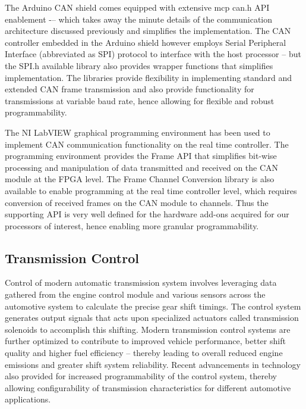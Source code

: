 \documentclass{article}
\begin{document}
\begin{flushleft}
The Arduino CAN shield comes equipped with extensive mcp can.h API enablement -– which takes away the minute details of the communication architecture discussed previously and simplifies the implementation. The CAN controller embedded in the Arduino shield however employs Serial Peripheral Interface (abbreviated as SPI) protocol to interface with the host processor – but the SPI.h available library also provides wrapper functions that simplifies implementation. The libraries provide flexibility in implementing standard and extended CAN frame transmission and also provide functionality for transmissions at variable baud rate, hence allowing for flexible and robust programmability. 
\end{flushleft}

\begin{flushleft}
The NI LabVIEW graphical programming environment has been used to implement CAN communication functionality on the real time controller. The programming environment provides the Frame API that simplifies bit-wise processing and manipulation of data transmitted and received on the CAN module at the FPGA level. The Frame Channel Conversion library is also available to enable programming at the real time controller level, which requires conversion of received frames on the CAN module to channels. Thus the supporting API is very well defined for the hardware add-ons acquired for our processors of interest, hence enabling more granular programmability.
\end{flushleft}

\subsection{Transmission Control}
\begin{flushleft}
Control of modern automatic transmission system involves leveraging data gathered from the engine control module and various sensors across the automotive system to calculate the precise gear shift timings. The control system generates output signals that acts upon specialized actuators called transmission solenoids to accomplish this shifting. Modern transmission control systems are further optimized to contribute to improved vehicle performance, better shift quality and higher fuel efficiency – thereby leading to overall reduced engine emissions and greater shift system reliability. Recent advancements in technology also provided for increased programmability of the control system, thereby allowing configurability of transmission characteristics for different automotive applications.
\end{flushleft}
\end{document}
